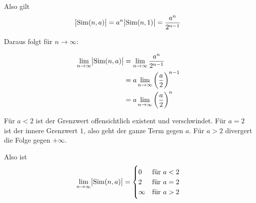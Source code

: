 \documentclass[a4paper,german,12pt,smallheadings]{scrartcl}
\begin{document}

Also gilt
\begin{equation*}
  \envert{\operatorname{Sim}(n,a)} = a^n \envert{\operatorname{Sim}(n,1)} = \frac{a^n}{2^{n-1}}
\end{equation*}

Daraus folgt für $n \to \infty$:

\begin{align*}
  \lim\limits_{n \to \infty} \envert{\operatorname{Sim}(n,a)} &= \lim\limits_{n \to \infty} \frac{a^n}{2^{n-1}} \\
                                                              &= a \lim\limits_{n \to \infty} \del{\frac{a}{2}}^{n-1} \\
                                                              &= a \lim\limits_{n \to \infty} \del{\frac{a}{2}}^{n}
\end{align*}

Für $a < 2$ ist der Grenzwert offensichtlich existent und verschwindet. %
Für $a = 2$ ist der innere Grenzwert $1$, also geht der ganze Term gegen $a$.
Für $a > 2$ divergert die Folge gegen $+ \infty$.

Also ist
\begin{align*}
  \lim\limits_{n \to \infty} \envert{\operatorname{Sim}(n,a)} =
  \begin{cases} 
    0 &\mbox{für } a < 2 \\
    2 & \mbox{für } a = 2 \\
    \infty & \mbox{für } a > 2 \\
    \end{cases}
\end{align*}
\end{document}
